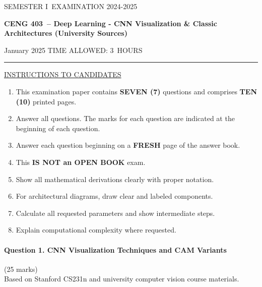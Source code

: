 \documentclass[12pt]{article}
\newcommand{\masunitnumber}{CENG 403}
\newcommand{\examdate}{January 2025}
\newcommand{\academicyear}{2024-2025}
\newcommand{\semester}{I}
\newcommand{\coursename}{Deep Learning - CNN Visualization \& Classic Architectures (University Sources)}
\newcommand{\numberofhours}{3}
\begin{document}
\setlength{\headsep}{5truemm}
\setlength{\headheight}{14.5truemm}
\setlength{\voffset}{-0.45truein}
\renewcommand{\headrulewidth}{0.0pt}
\begin{center}
SEMESTER \semester\ EXAMINATION \academicyear
\end{center}
\begin{center}
{\bf \masunitnumber\ -- \coursename}
\end{center}
\vspace{20truemm}
\noindent \examdate\hspace{45truemm} TIME ALLOWED: \numberofhours\ HOURS
\vspace{19truemm}
\hrule
\vspace{19truemm}
\noindent\underline{INSTRUCTIONS TO CANDIDATES}
\vspace{8truemm}
\begin{enumerate}
\item This examination paper contains {\bf SEVEN (7)} questions and comprises 
{\bf TEN (10)} printed pages.
\item Answer all questions. 
The marks for each question are indicated at the beginning of each question.
\item Answer each question beginning on a {\bf FRESH} page of the answer book.
\item This {\bf IS NOT an OPEN BOOK} exam.
\item Show all mathematical derivations clearly with proper notation.
\item For architectural diagrams, draw clear and labeled components.
\item Calculate all requested parameters and show intermediate steps.
\item Explain computational complexity where requested.
\end{enumerate}
\newpage
\lhead{}
\rhead{\masunitnumber}
\chead{}
\lfoot{}
\cfoot{\thepage}
\rfoot{}
\setlength{\footskip}{45pt}

\paragraph{Question 1. CNN Visualization Techniques and CAM Variants}{\hfill (25 marks)}\\
Based on Stanford CS231n and university computer vision course materials.
\end{document}

